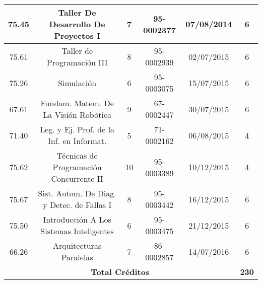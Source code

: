{\begin{center}
\begin{tabular}{|c|c|c|c|c|c|}
            \hline
            75.45 & Taller De Desarrollo De Proyectos I         &  7   &  95-0002377  &  07/08/2014  & 6  \\
            \hline
            75.61 & Taller de Programación III                  &  8   &  95-0002939  &  02/07/2015  & 6  \\
            \hline
            75.26 & Simulación                                  &  6   &  95-0003075  &  15/07/2015  & 6  \\
            \hline
            67.61 & Fundam. Matem. De La Visión Robótica        &  9   &  67-0002447  &  30/07/2015  & 6  \\
            \hline
            71.40 & Leg. y Ej. Prof. de la Inf. en Informat.    &  5   &  71-0002162  &  06/08/2015  & 4  \\
            \hline
            75.62 & Técnicas de Programación Concurrente II     &  10  &  95-0003389  &  10/12/2015  & 4  \\
            \hline
            75.67 & Sist. Autom. De Diag. y Detec. de Fallas I  &  8   &  95-0003442  &  16/12/2015  & 6  \\
            \hline
            75.50 & Introducción A Los Sistemas Inteligentes    &  6   &  95-0003475  &  21/12/2015  & 6  \\
            \hline
            66.26 & Arquitecturas Paralelas                     &  7   &  86-0002857  &  14/07/2016  & 6  \\
            \hline
            \multicolumn{5}{|c|}{\textbf{Total Créditos}} & \textbf{230} \\
            \hline
        \end{tabular}
        \end{center}
    }
